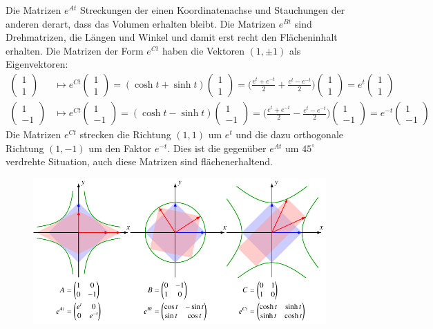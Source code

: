 \begin{beispiel}
Die Matrizen $e^{At}$ Streckungen der einen Koordinatenachse und
Stauchungen der anderen derart, dass das Volumen erhalten bleibt.
Die Matrizen $e^{Bt}$ sind Drehmatrizen, die Längen und Winkel und
damit erst recht den Flächeninhalt erhalten.
Die Matrizen der Form $e^{Ct}$ haben die Vektoren $(1,\pm1)$ als
Eigenvektoren:
\begin{align*}
\begin{pmatrix}1\\1\end{pmatrix}
&\mapsto
e^{Ct}
\begin{pmatrix}1\\1\end{pmatrix}
=
(\cosh t +\sinh t)
\begin{pmatrix}1\\1\end{pmatrix}
=
\biggl(
\frac{e^t+e^{-t}}2
+
\frac{e^t-e^{-t}}2
\biggr)
\begin{pmatrix}1\\1\end{pmatrix}
=
e^t
\begin{pmatrix}1\\1\end{pmatrix}
\\
\begin{pmatrix}1\\-1\end{pmatrix}
&\mapsto
e^{Ct}
\begin{pmatrix}1\\-1\end{pmatrix}
=
(\cosh t -\sinh t)
\begin{pmatrix}1\\-1\end{pmatrix}
=
\biggl(
\frac{e^t+e^{-t}}2
-
\frac{e^t-e^{-t}}2
\biggr)
\begin{pmatrix}1\\-1\end{pmatrix}
=
e^{-t}
\begin{pmatrix}1\\-1\end{pmatrix}
\end{align*}
Die Matrizen $e^{Ct}$ strecken die Richtung $(1,1)$ um $e^t$ und
die dazu orthogonale Richtung $(1,-1)$ um den Faktor $e^{-t}$.
Dies ist die gegenüber $e^{At}$ um $45^\circ$ verdrehte Situation,
auch diese Matrizen sind flächenerhaltend.
\begin{figure}
\centering
\includegraphics{chapters/60-gruppen/images/sl2.pdf}

\end{figure}
\end{beispiel}
